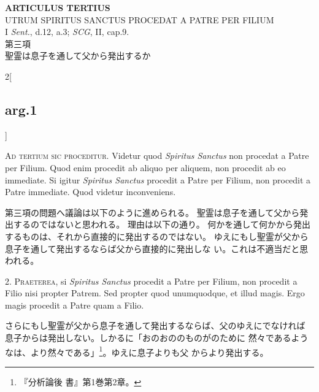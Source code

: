 \documentclass[paper=a4paper,fontsize=10pt,jafontsize=9pt,titlepage]{jlreq}
\begin{document}
\begin{center}
{\Large {\bfseries ARTICULUS TERTIUS}}\\
{\large UTRUM SPIRITUS SANCTUS PROCEDAT A PATRE PER FILIUM}\\
{\footnotesize I {\itshape Sent.}, d.12, a.3; {\itshape SCG}, II, cap.9.}\\
{\Large 第三項\\聖霊は息子を通して父から発出するか}
\end{center}


{}
\setcounter{section}{3}
\setcounter{subsection}{0}

\begin{paracol}{2}[\subsection{arg.1}]

{\scshape Ad tertium sic proceditur}. Videtur quod {\itshape  Spiritus Sanctus}
non procedat a Patre per Filium. Quod enim procedit ab aliquo per
aliquem, non procedit ab eo immediate. Si igitur {\itshape  Spiritus
Sanctus} procedit a Patre per Filium, non procedit a Patre
immediate. Quod videtur inconveniens.

\switchcolumn

第三項の問題へ議論は以下のように進められる。
聖霊は息子を通して父から発出するのではないと思われる。
理由は以下の通り。
何かを通して何かから発出するものは、それから直接的に発出するのではない。
ゆえにもし聖霊が父から息子を通して発出するならば父から直接的に発出しな
 い。これは不適当だと思われる。


2. {\scshape Praeterea}, si {\itshape  Spiritus Sanctus} procedit a Patre per
Filium, non procedit a Filio nisi propter Patrem. Sed propter quod
unumquodque, et illud magis. Ergo magis procedit a Patre quam a Filio.

\switchcolumn

さらにもし聖霊が父から息子を通して発出するならば、父のゆえにでなければ
 息子からは発出しない。しかるに「おのおののものがのために
 然々であるようなは、より然々である」\footnote{『分析論後
 書』第1巻第2章。}。ゆえに息子よりも父
 からより発出する。


\end{paracol}
\end{document}
